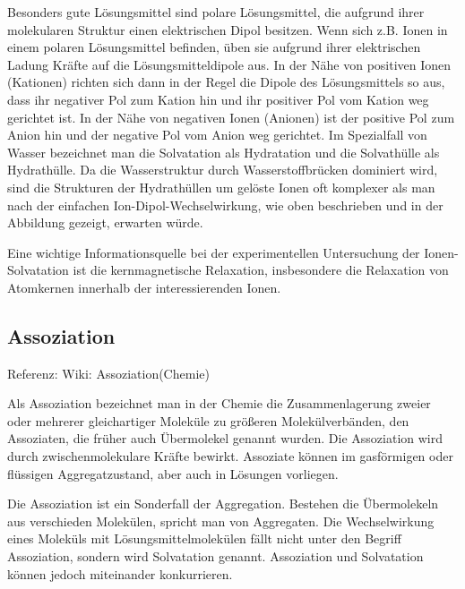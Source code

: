 \documentclass[]{article}
\begin{document}
Besonders gute Lösungsmittel sind polare Lösungsmittel, die aufgrund ihrer molekularen Struktur einen elektrischen Dipol besitzen. Wenn sich z.B. Ionen in einem polaren Lösungsmittel befinden, üben sie aufgrund ihrer elektrischen Ladung Kräfte auf die Lösungsmitteldipole aus. In der Nähe von positiven Ionen (Kationen) richten sich dann in der Regel die Dipole des Lösungsmittels so aus, dass ihr negativer Pol zum Kation hin und ihr positiver Pol vom Kation weg gerichtet ist. In der Nähe von negativen Ionen (Anionen) ist der positive Pol zum Anion hin und der negative Pol vom Anion weg gerichtet. Im Spezialfall von Wasser bezeichnet man die Solvatation als Hydratation und die Solvathülle als Hydrathülle. Da die Wasserstruktur durch Wasserstoffbrücken dominiert wird, sind die Strukturen der Hydrathüllen um gelöste Ionen oft komplexer als man nach der einfachen Ion-Dipol-Wechselwirkung, wie oben beschrieben und in der Abbildung gezeigt, erwarten würde.

Eine wichtige Informationsquelle bei der experimentellen Untersuchung der Ionen-Solvatation ist die kernmagnetische Relaxation, insbesondere die Relaxation von Atomkernen innerhalb der interessierenden Ionen.

\subsection{Assoziation}
Referenz: Wiki:  Assoziation(Chemie)

Als Assoziation bezeichnet man in der Chemie die Zusammenlagerung zweier oder mehrerer gleichartiger Moleküle zu größeren Molekülverbänden, den Assoziaten, die früher auch Übermolekel genannt wurden. Die Assoziation wird durch zwischenmolekulare Kräfte bewirkt. Assoziate können im gasförmigen oder flüssigen Aggregatzustand, aber auch in Lösungen vorliegen.

Die Assoziation ist ein Sonderfall der Aggregation. Bestehen die Übermolekeln aus verschieden Molekülen, spricht man von Aggregaten. Die Wechselwirkung eines Moleküls mit Lösungsmittelmolekülen fällt nicht unter den Begriff Assoziation, sondern wird Solvatation genannt. Assoziation und Solvatation können jedoch miteinander konkurrieren.
\end{document}
